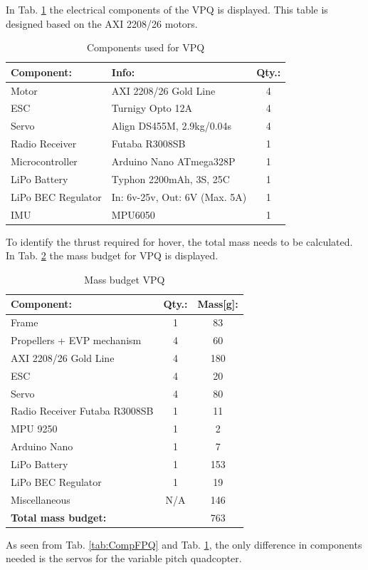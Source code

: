 \noindent
In Tab. \ref{tab:CompVPQ} the electrical components of the VPQ is displayed. This table is designed based on the AXI 2208/26 motors. 
\begin{table}[H]
    \begin{center}
    \caption{Components used for VPQ} 
    \label{tab:CompVPQ} 
        \begin{tabular}{|l|l|c|}
            \hline 
            \textbf{Component:} & \textbf{Info:} & \textbf{Qty.:}  \\ 
            \hline
            Motor & AXI 2208/26 Gold Line & 4 \\
            ESC & Turnigy Opto 12A & 4 \\
            Servo & Align DS455M, 2.9kg/0.04s & 4  \\ 
            Radio Receiver & Futaba R3008SB & 1  \\
            Microcontroller & Arduino Nano  ATmega328P& 1 \\
            LiPo Battery & Typhon 2200mAh, 3S, 25C & 1 \\
            LiPo BEC Regulator & In: 6v-25v, Out: 6V (Max. 5A)  & 1\\
            IMU & MPU6050 & 1 \\
            \hline
        \end{tabular}
    \end{center}
\end{table}
\noindent
\clearpage
To identify the thrust required for hover, the total mass needs to be calculated. In Tab. \ref{tab:WeightVPQ} the mass budget for VPQ is displayed.
\begin{table}[H]
    \begin{center}
    \caption{Mass budget VPQ} 
    \label{tab:WeightVPQ} 
        \begin{tabular}{|l|c|c|}
            \hline 
            \textbf{Component:} & \textbf{Qty.:} & \textbf{Mass[g]:}  \\ \hline
            Frame & 1 & 83\\
            Propellers + EVP mechanism & 4 & 60\\
            AXI 2208/26 Gold Line  & 4 & 180 \\
            ESC & 4 & 20\\
            Servo & 4 & 80 \\
            Radio Receiver Futaba R3008SB & 1 & 11\\
            MPU 9250 & 1 & 2 \\
            Arduino Nano & 1 & 7 \\
            LiPo Battery & 1 & 153 \\
            LiPo BEC Regulator & 1 & 19 \\
            Miscellaneous & N/A & 146 \\\hline
            \textbf{Total mass budget:} & & 763 \\
            \hline
        \end{tabular}
    \end{center}
\end{table}
\noindent
As seen from Tab. \ref{tab:CompFPQ} and Tab. \ref{tab:CompVPQ}, the only difference in components needed is the servos for the variable pitch quadcopter. 

